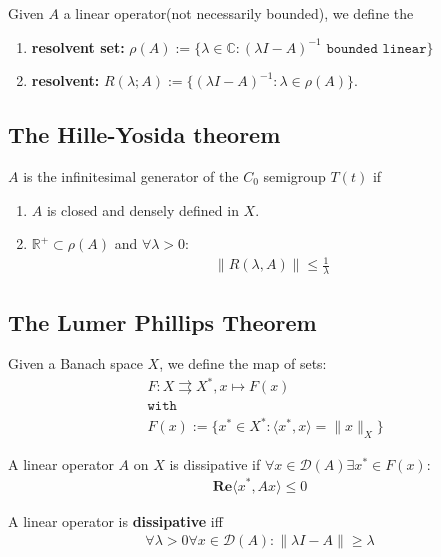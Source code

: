 \begin{definition}
	Given $A$ a linear operator(not necessarily bounded), we define the 
	\begin{enumerate}
		\item \textbf{resolvent set:} $\rho(A):= \{ \lambda \in \mathbb{C}: (\lambda I - A)^{-1} \texttt{ bounded linear} \}$
		\item \textbf{resolvent:} $R(\lambda; A):= \{ (\lambda I - A)^{-1}: \lambda \in \rho(A)\}$.
	\end{enumerate}
\end{definition}


\subsection{The Hille-Yosida theorem}
\begin{theorem}
	$A$ is the infinitesimal generator of the $C_0$ semigroup $T(t)$ if
	\begin{enumerate}
		\item $A$ is closed and densely defined in $X$. 
		\item $\mathbb{R}^+ \subset \rho(A)$ and $\forall \lambda >0$:
		\begin{align*}
			\|R(\lambda, A)\| \le \frac{1}{\lambda} 
		\end{align*}
	\end{enumerate}
\end{theorem}

\subsection{The Lumer Phillips Theorem}
Given a Banach space $X$, we define the map of sets:
\begin{align*}
	& F: X \rightrightarrows X^*, x \mapsto F(x)\\
	& \texttt{with}\\
	& F(x):= \{x^* \in X^*: \langle x^*, x\rangle = \|x\|_X \}
\end{align*}

\begin{definition}
	A linear operator $A$ on $X$ is dissipative if $\forall x \in \mathcal{D}(A) \exists x^* \in F(x):$
	\begin{align*}
		\textbf{Re} \langle x^*,   Ax \rangle \le 0
	\end{align*}
\end{definition}

\begin{theorem}
	A linear operator is \textbf{dissipative} iff
	\begin{align*}
		\forall \lambda > 0 \forall x \in \mathcal{D}(A): \|\lambda I - A\| \ge \lambda
	\end{align*}
\end{theorem}
 
